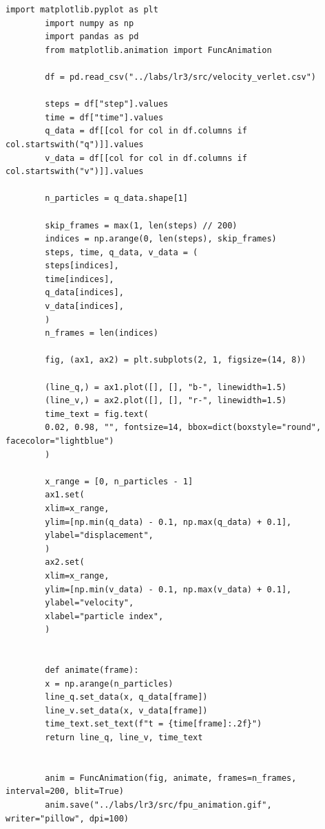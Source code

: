\documentclass[14pt,a4paper]{extarticle}
\theoremstyle{plain}
\begin{document}
	\begin{lstlisting}[title=main.py, gobble=16, breaklines=true, breakatwhitespace=true]
		import matplotlib.pyplot as plt
		import numpy as np
		import pandas as pd
		from matplotlib.animation import FuncAnimation
		
		df = pd.read_csv("../labs/lr3/src/velocity_verlet.csv")
		
		steps = df["step"].values
		time = df["time"].values
		q_data = df[[col for col in df.columns if col.startswith("q")]].values
		v_data = df[[col for col in df.columns if col.startswith("v")]].values
		
		n_particles = q_data.shape[1]
		
		skip_frames = max(1, len(steps) // 200)
		indices = np.arange(0, len(steps), skip_frames)
		steps, time, q_data, v_data = (
		steps[indices],
		time[indices],
		q_data[indices],
		v_data[indices],
		)
		n_frames = len(indices)
		
		fig, (ax1, ax2) = plt.subplots(2, 1, figsize=(14, 8))
		
		(line_q,) = ax1.plot([], [], "b-", linewidth=1.5)
		(line_v,) = ax2.plot([], [], "r-", linewidth=1.5)
		time_text = fig.text(
		0.02, 0.98, "", fontsize=14, bbox=dict(boxstyle="round", facecolor="lightblue")
		)
		
		x_range = [0, n_particles - 1]
		ax1.set(
		xlim=x_range,
		ylim=[np.min(q_data) - 0.1, np.max(q_data) + 0.1],
		ylabel="displacement",
		)
		ax2.set(
		xlim=x_range,
		ylim=[np.min(v_data) - 0.1, np.max(v_data) + 0.1],
		ylabel="velocity",
		xlabel="particle index",
		)
		
		
		def animate(frame):
		x = np.arange(n_particles)
		line_q.set_data(x, q_data[frame])
		line_v.set_data(x, v_data[frame])
		time_text.set_text(f"t = {time[frame]:.2f}")
		return line_q, line_v, time_text
		
		
		anim = FuncAnimation(fig, animate, frames=n_frames, interval=200, blit=True)
		anim.save("../labs/lr3/src/fpu_animation.gif", writer="pillow", dpi=100)		
	\end{lstlisting}
	
\end{document}
